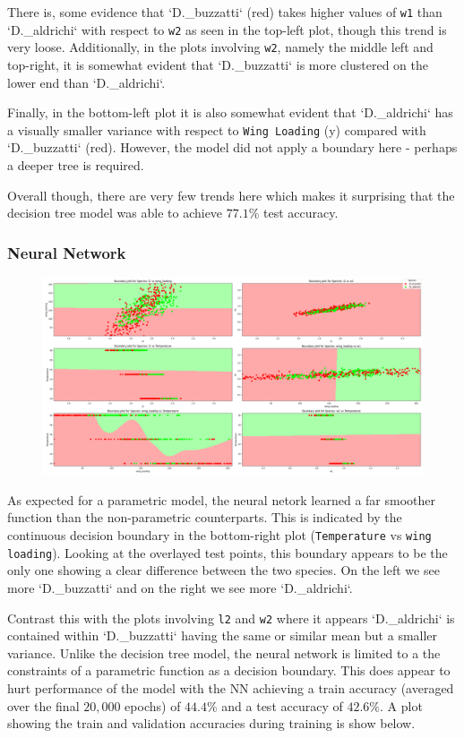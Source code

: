 \documentclass{article}
\begin{document}
There is, some evidence that `D._buzzatti` (red) takes higher values of \texttt{w1} than `D._aldrichi` with respect to \texttt{w2} as seen in the top-left plot, though this trend is very loose. Additionally, in the plots involving \texttt{w2}, namely the middle left and top-right, it is somewhat evident that `D._buzzatti` is more clustered on the lower end than `D._aldrichi`.

Finally, in the bottom-left plot it is also somewhat evident that `D._aldrichi` has a visually smaller variance with respect to \texttt{Wing Loading} (y) compared with `D._buzzatti` (red). However, the model did not apply a boundary here - perhaps a deeper tree is required.

Overall though, there are very few trends here which makes it surprising that the decision tree model was able to achieve $77.1\%$ test accuracy.


\subsubsection{Neural Network}

\begin{figure}
    \centering
    \includegraphics{plots/nn_Thorax_decision_boundaries_Species.png}
    \caption{}
    \label{fig:}
\end{figure}

As expected for a parametric model, the neural netork learned a far smoother function than the non-parametric counterparts. This is indicated by the continuous decision boundary in the bottom-right plot (\texttt{Temperature} vs \texttt{wing loading}). Looking at the overlayed test points, this boundary appears to be the only one showing a clear difference between the two species. On the left we see more `D._buzzatti` and on the right we see more `D._aldrichi`.

Contrast this with the plots involving \texttt{l2} and \texttt{w2} where it appears `D._aldrichi` is contained within `D._buzzatti` having the same or similar mean but a smaller variance. Unlike the decision tree model, the neural network is limited to a the constraints of a parametric function as a decision boundary. This does appear to hurt performance of the model with the NN achieving a train accuracy (averaged over the final $20,000$ epochs) of $44.4\%$ and a test accuracy of $42.6\%$. A plot showing the train and validation accuracies during training is show below.
\end{document}
